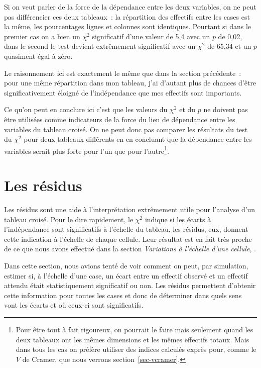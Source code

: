 \documentclass[a4paper,10pt,twoside,francais]{report}
\newcommand{\chid}{$\chi^2$\xspace}
\begin{document}
Si on veut parler de la force de la dépendance entre les deux
variables, on ne peut pas différencier ces deux tableaux~: la
répartition des effectifs entre les cases est la même, les
pourcentages lignes et colonnes sont identiques. Pourtant si dans le
premier cas on a bien un \chid significatif d'une valeur de 5,4 avec
un $p$ de 0,02, dans le second le test devient extrêmement significatif
avec un \chid de 65,34 et un $p$ quasiment égal à zéro.

Le raisonnement ici est exactement le même que dans la section
précédente~: pour une même répartition dans mon tableau, j'ai d'autant
plus de chances d'être significativement éloigné de l'indépendance que
mes effectifs sont importants.

Ce qu'on peut en conclure ici c'est que les valeurs du \chid et du $p$
ne doivent pas être utilisées comme indicateurs de la force du lien de
dépendance entre les variables du tableau croisé. On ne peut donc pas
comparer les résultats du test du \chid pour deux tableaux différents
en en concluant que la dépendance entre les variables serait plus
forte pour l'un que pour l'autre\footnote{Pour être tout à fait
  rigoureux, on pourrait le faire mais seulement quand les deux
  tableaux ont les mêmes dimensions et les mêmes effectifs
  totaux. Mais dans tous les cas on préfère utiliser des indices
  calculés exprès pour, comme le $V$ de Cramer, que nous verrons
  section~\vref{sec-vcramer}.}.


\section{Les résidus}
\label{sec-residus}

Les résidus sont une aide à l'interprétation extrêmement utile pour
l'analyse d'un tableau croisé. Pour le dire rapidement, le \chid
indique si les écarts à l'indépendance sont significatifs à l'échelle
du tableau, les résidus, eux, donnent cette indication à l'échelle de
chaque cellule. Leur résultat est en fait très proche de ce que nous
avons effectué dans la section \textit{Variations à l'échelle d'une
  cellule}, . 

Dans cette section, nous avions tenté de voir comment on peut, par
simulation, estimer si, à l'échelle d'une case, un écart entre un
effectif observé et un effectif attendu était statistiquement
significatif ou non. Les résidus permettent d'obtenir cette
information pour toutes les cases et donc de déterminer dans quels
sens vont les écarts et où ceux-ci sont significatifs.
\end{document}
